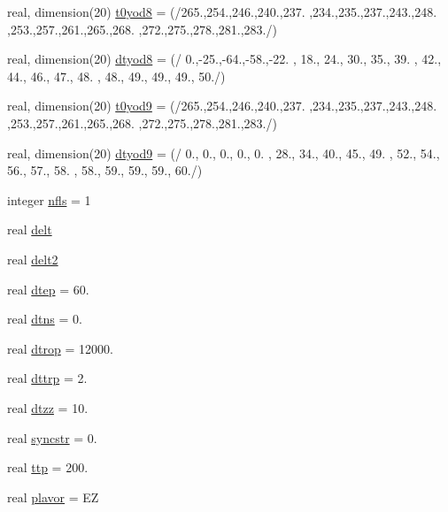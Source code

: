 \begin{DoxyCompactItemize}
\item 
real, dimension(20) \hyperlink{classpumamod_a5a6a9e0c6cef3144d8d0c455fa24e42a}{t0yod8} = (/265.,254.,246.,240.,237. ,234.,235.,237.,243.,248. ,253.,257.,261.,265.,268. ,272.,275.,278.,281.,283./)
\item 
real, dimension(20) \hyperlink{classpumamod_a850c526a93c8b38f08112d84f46c3d61}{dtyod8} = (/ 0.,-\/25.,-\/64.,-\/58.,-\/22. , 18., 24., 30., 35., 39. , 42., 44., 46., 47., 48. , 48., 49., 49., 49., 50./)
\item 
real, dimension(20) \hyperlink{classpumamod_ac0e77a6a01e1b88a9c1b29535bf4a5d5}{t0yod9} = (/265.,254.,246.,240.,237. ,234.,235.,237.,243.,248. ,253.,257.,261.,265.,268. ,272.,275.,278.,281.,283./)
\item 
real, dimension(20) \hyperlink{classpumamod_a9599e6b32e3833c098fe5029b7ee70be}{dtyod9} = (/ 0., 0., 0., 0., 0. , 28., 34., 40., 45., 49. , 52., 54., 56., 57., 58. , 58., 59., 59., 59., 60./)
\item 
integer \hyperlink{classpumamod_a4766e3a4673c92cf9958d8241cbcbc65}{nfls} = 1
\item 
real \hyperlink{classpumamod_a439717e747222ba51cf20b010f3e516c}{delt}
\item 
real \hyperlink{classpumamod_a42f46b51b6a92eed14840e3c161d80a1}{delt2}
\item 
real \hyperlink{classpumamod_ae1160d24a7abdc97bc3389044621d3d7}{dtep} = 60.
\item 
real \hyperlink{classpumamod_a9f9ff76b20700deda41db8834db4b3c3}{dtns} = 0.
\item 
real \hyperlink{classpumamod_a58d401b03b69eccd92e7864d3d821c4c}{dtrop} = 12000.
\item 
real \hyperlink{classpumamod_ac02146e243330a0df79fb4657d748ef4}{dttrp} = 2.
\item 
real \hyperlink{classpumamod_af197fe0d42694469ea20c754ddfb1172}{dtzz} = 10.
\item 
real \hyperlink{classpumamod_a3584bf754ed1ce4f81f9ae5c2d909c55}{syncstr} = 0.
\item 
real \hyperlink{classpumamod_a7e20a606bb6a44f41a19e4b5f5a8cd3c}{ttp} = 200.
\item 
real \hyperlink{classpumamod_aacb92e3b939fec35b06f04caded9fc93}{plavor} = \-E\-Z

\end{DoxyCompactItemize}
